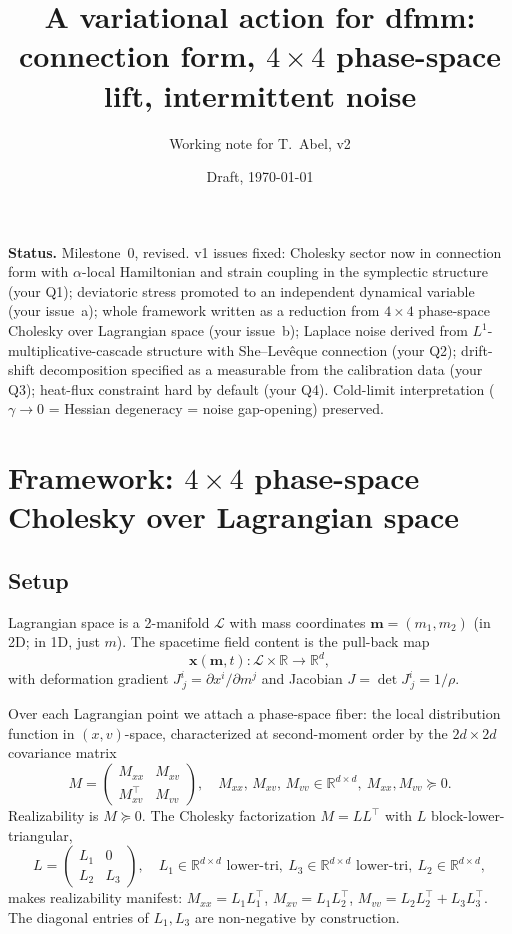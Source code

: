\documentclass[11pt]{article}
\title{A variational action for dfmm:\\
  connection form, $4\times4$ phase-space lift, intermittent noise}
\author{Working note for T.~Abel, v2}
\date{Draft, \today}
\begin{document}
\maketitle

\noindent\textbf{Status.} Milestone~0, revised. v1 issues fixed: Cholesky
sector now in connection form with $\alpha$-local Hamiltonian and strain
coupling in the symplectic structure (your Q1); deviatoric stress promoted
to an independent dynamical variable (your issue~a); whole framework
written as a reduction from $4{\times}4$ phase-space Cholesky over
Lagrangian space (your issue~b); Laplace noise derived from
$L^1$-multiplicative-cascade structure with She--Lev\^eque connection
(your Q2); drift-shift decomposition specified as a measurable from the
calibration data (your Q3); heat-flux constraint hard by default (your
Q4). Cold-limit interpretation
($\gamma\to0$ = Hessian degeneracy = noise gap-opening) preserved.

\section{Framework: $4\times4$ phase-space Cholesky over Lagrangian space}

\subsection{Setup}
Lagrangian space is a 2-manifold $\mathcal{L}$ with mass coordinates
$\bm{m} = (m_1, m_2)$ (in 2D; in 1D, just $m$). The spacetime field
content is the pull-back map
\[
  \bm{x}(\bm{m}, t)\colon \mathcal{L}\times\mathbb{R}\to\mathbb{R}^d,
\]
with deformation gradient $J^i_{\,j} = \partial x^i/\partial m^j$ and
Jacobian $J = \det J^i_{\,j} = 1/\rho$.

Over each Lagrangian point we attach a phase-space fiber: the local
distribution function in $(x, v)$-space, characterized at second-moment
order by the $2d\times 2d$ covariance matrix
\begin{equation}
  M = \begin{pmatrix} M_{xx} & M_{xv} \\ M_{xv}^\top & M_{vv}\end{pmatrix},
  \quad
  M_{xx},\,M_{xv},\,M_{vv}\in\mathbb{R}^{d\times d},\
  M_{xx}, M_{vv}\succeq 0.
\end{equation}
Realizability is $M\succeq 0$. The Cholesky factorization $M = LL^\top$
with $L$ block-lower-triangular,
\begin{equation}
  L = \begin{pmatrix} L_1 & 0 \\ L_2 & L_3 \end{pmatrix},\quad
  L_1\in\mathbb{R}^{d\times d}\text{ lower-tri},\
  L_3\in\mathbb{R}^{d\times d}\text{ lower-tri},\
  L_2\in\mathbb{R}^{d\times d},
  \label{eq:Lblock}
\end{equation}
makes realizability manifest: $M_{xx} = L_1 L_1^\top$,
$M_{xv} = L_1 L_2^\top$, $M_{vv} = L_2 L_2^\top + L_3 L_3^\top$. The
diagonal entries of $L_1, L_3$ are non-negative by construction.
\end{document}
